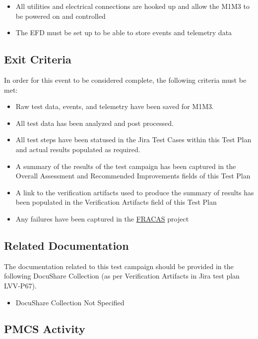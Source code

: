 \documentclass[SE,lsstdraft,STR,toc]{lsstdoc}
\providecommand{\tightlist}{
  \setlength{\itemsep}{0pt}\setlength{\parskip}{0pt}}
\begin{document}
\begin{itemize}
\tightlist
\item
  All utilities and electrical connections are hooked up and allow the
  M1M3 to be powered on and controlled
\item
  The EFD must be set up to be able to store events and telemetry data
\end{itemize}

  \subsection{Exit Criteria}
  In order for this event to be considered complete, the following
criteria must be met:

\begin{itemize}
\tightlist
\item
  Raw test data, events, and telemetry have been saved for M1M3.
\item
  All test data has been analyzed and post processed.
\item
  All test steps have been statused in the Jira Test Cases within this
  Test Plan and actual results populated as required.
\item
  A summary of the results of the test campaign has been captured in the
  Overall Assessment and Recommended Improvements fields of this Test
  Plan
\item
  A link to the verification artifacts used to produce the summary of
  results has been populated in the Verification Artifacts field of this
  Test Plan
\item
  Any failures have been captured in the
  \href{https://jira.lsstcorp.org/projects/FRACAS/issues/}{FRACAS}
  project
\end{itemize}


\subsection{Related Documentation}

The documentation related to this test campaign should be provided in the following DocuShare Collection
(as per Verification Artifacts in Jira test plan LVV-P67).

\begin{itemize}
\item DocuShare Collection Not Specified
\end{itemize}



\subsection{PMCS Activity}
\end{document}
